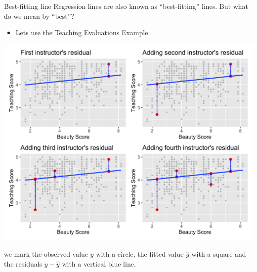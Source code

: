 \documentclass[
  ignorenonframetext,
]{beamer}
\providecommand{\tightlist}{%
  \setlength{\itemsep}{0pt}\setlength{\parskip}{0pt}}
\begin{document}
\begin{frame}{Best-fitting line}
\protect\hypertarget{best-fitting-line}{}
Regression lines are also known as ``best-fitting'' lines. But what do
we mean by ``best''?

\begin{itemize}
\tightlist
\item
  Lets use the Teaching Evaluations Example.
\end{itemize}

\begin{center}\includegraphics[width=0.8\linewidth,height=0.5\textheight]{week4_9} \end{center}

we mark the observed value \(y\) with a circle, the fitted value
\(\hat{y}\) with a square and the residuals \(y-\hat{y}\) with a
vertical blue line.
\end{frame}
\end{document}
